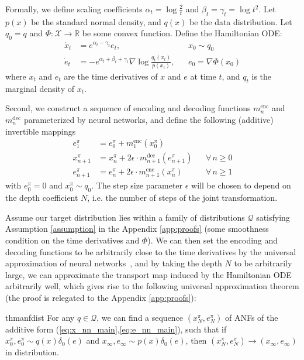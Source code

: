 \documentclass{article}
\def\gQ{{\mathcal{Q}}}
\def\gX{{\mathcal{X}}}
\newcommand{\R}{\mathbb{R}}
\newcommand{\e}{\epsilon}
\begin{document}
Formally, we define scaling coefficients $\alpha_t = \log \frac{2}{t}$ and $\beta_t = \gamma_t = \log t^2$.
Let $p(x)$ be the standard normal density, and $q(x)$ be the data distribution.
Let $q_0=q$ and $\Phi:\gX\rightarrow\R$ be some convex function. 
Define the Hamiltonian ODE:
\begin{align}
\dot{x}_t &= e^{\alpha_t-\gamma_t}e_t, && x_0\sim q_0 \nonumber \\
\dot{e}_t &= -e^{\alpha_t+\beta_t+\gamma_t}\nabla\log \frac{q_t(x_t)}{p(x_t)}, &&e_0=\nabla\Phi(x_0) \nonumber \end{align}
where $\dot{x}_t$ and $\dot{e}_t$ are the time derivatives of $x$ and $e$ at time $t$, and $q_t$ is the marginal density of $x_t$. 

Second, we construct a sequence of encoding and decoding functions $m^{\text{enc}}_{n}$ and $m^{\text{dec}}_{n}$ parameterized by neural networks, and define the following (additive) invertible mappings
\begin{align}
e^\pi_{1} &= e^\pi_0 + m^{\text{enc}}_{1}(x^\pi_0)\nonumber\\
x^\pi_{n+1} &= x^\pi_{n} + 2\e \cdot m^{\text{dec}}_{{n+1}}(e^\pi_{n+1})  && \forall\,n\geq0 \label{eq:x_nn_main}
\\
e^\pi_{n+1} &= e^\pi_n + 2\e \cdot m^{\text{enc}}_{{n+1}}(x^\pi_n) && \forall\,n\geq1 \label{eq:e_nn_main}
\end{align}
with $e^\pi_0=0$ and $x^\pi_0 \sim q_0$. 
The step size parameter $\e$ will be chosen to depend on the depth coefficient $N$, i.e. the number of steps of the joint transformation. 

Assume our target distribution lies within a family of distributions $\gQ$ satisfying Assumption \ref{assumption} in the Appendix \ref{app:proofs} (some smoothness condition on the time derivatives and $\Phi$). 
We can then set the encoding and decoding functions to be arbitrarily close to the time derivatives by the universal approximation of neural networks~\citep{cybenko1989approximation}, and by taking the depth $N$ to be arbitrarily large, we can approximate the transport map induced by the Hamiltonian ODE arbitrarily well, which gives rise to the following universal approximation theorem (the proof is relegated to the Appendix \ref{app:proofs}):
\begin{restatable}{thm}{anfdist}
\label{thm:anf_dist}
For any $q\in\gQ$, we can find a sequence $(x^\pi_N,e^\pi_N)$ of ANFs of the additive form (\ref{eq:x_nn_main},\ref{eq:e_nn_main}), such that if $x^\pi_0,e^\pi_0\sim q(x)\delta_0(e)$ and $x_\infty, e_\infty\sim p(x)\delta_0(e)$, then $(x^\pi_N,e^\pi_N)\rightarrow (x_\infty, e_\infty)$ in distribution. 
\end{restatable}
\end{document}
